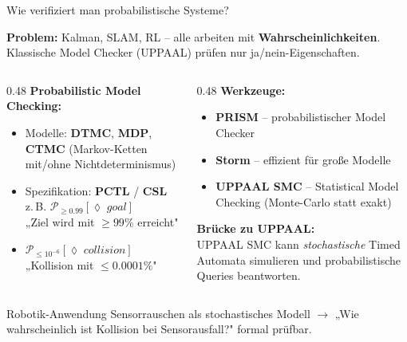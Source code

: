 \documentclass[%
  aspectratio=169,
  10pt
]{beamer}
\newcommand{\hl}[1]{{\color{fbblau}\textbf{#1}}}
\begin{document}
\begin{frame}{Wie verifiziert man probabilistische Systeme?}

\textbf{Problem:} Kalman, SLAM, RL -- alle arbeiten mit \hl{Wahrscheinlichkeiten}.
Klassische Model Checker (UPPAAL) prüfen nur ja/nein-Eigenschaften.

\vspace{2mm}
\begin{columns}[T]
  \begin{column}{0.48\textwidth}
    \textbf{Probabilistic Model Checking:}
    \begin{itemize}\setlength{\itemsep}{1pt}
      \item Modelle: \textbf{DTMC}, \textbf{MDP}, \textbf{CTMC}
            (Markov-Ketten mit/ohne Nichtdeterminismus)
      \item Spezifikation: \textbf{PCTL} / \textbf{CSL}\\
            z.\,B. $\mathcal{P}_{\geq 0.99}[\lozenge\;\textit{goal}]$\\
            {\scriptsize „Ziel wird mit $\geq 99\%$ erreicht"}
      \item $\mathcal{P}_{\leq 10^{-6}}[\lozenge\;\textit{collision}]$\\
            {\scriptsize „Kollision mit $\leq 0.0001\%$"}
    \end{itemize}
  \end{column}
  \begin{column}{0.48\textwidth}
    \textbf{Werkzeuge:}
    \begin{itemize}\setlength{\itemsep}{1pt}
      \item \textbf{PRISM} -- probabilistischer Model Checker
      \item \textbf{Storm} -- effizient für große Modelle
      \item \textbf{UPPAAL SMC} -- Statistical Model Checking
            (Monte-Carlo statt exakt)
    \end{itemize}

    \vspace{2mm}
    \textbf{Brücke zu UPPAAL:}\\
    UPPAAL SMC kann \emph{stochastische}
    Timed Automata simulieren und
    probabilistische Queries beantworten.
  \end{column}
\end{columns}

\vspace{1mm}
\begin{exampleblock}{Robotik-Anwendung}
  \vspace{-2mm}
  Sensorrauschen als stochastisches Modell $\rightarrow$ „Wie wahrscheinlich ist Kollision bei Sensorausfall?" formal prüfbar.\vspace{-2mm}
\end{exampleblock}

\end{frame}
\end{document}
